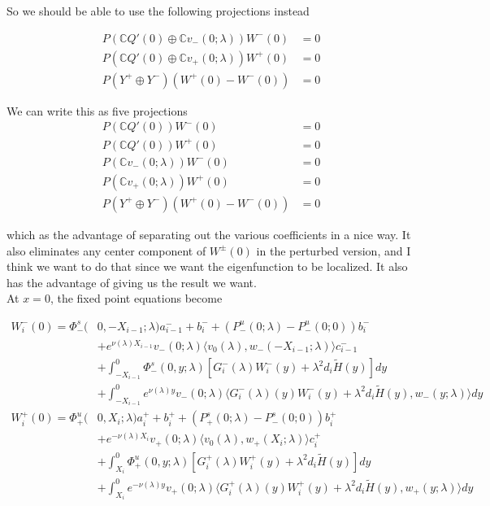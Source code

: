 \documentclass[12pt]{article}
\def\C{{\mathbb C}}
\begin{document}
\begin{enumerate}
So we should be able to use the following projections instead

\begin{align*}
P(\C Q'(0) \oplus \C v_-(0; \lambda) )W^-(0) &= 0 \\
P(\C Q'(0) \oplus \C v_+(0; \lambda) )W^+(0) &= 0 \\
P(Y^+ \oplus Y^-) (W^+(0) - W^-(0) ) &= 0
\end{align*}

We can write this as five projections
\begin{align*}
P(\C Q'(0) )W^-(0) &= 0 \\
P(\C Q'(0) )W^+(0) &= 0 \\
P(\C v_-(0; \lambda))W^-(0) &= 0 \\
P(\C v_+(0; \lambda))W^+(0) &= 0 \\
P(Y^+ \oplus Y^-) (W^+(0) - W^-(0) ) &= 0
\end{align*}

which as the advantage of separating out the various coefficients in a nice way. It also eliminates any center component of $W^\pm(0)$ in the perturbed version, and I think we want to do that since we want the eigenfunction to be localized. It also has the advantage of giving us the result we want.\\

At $x = 0$, the fixed point equations become

\begin{align*}
W_i^-(0) = \Phi^s_-(&0, -X_{i-1}; \lambda)a_{i-1}^- + b_i^- + (P^u_-(0; \lambda) - P^u_-(0; 0))b_i^- \\
&+ e^{\nu(\lambda)X_{i-1}} v_-(0; \lambda) \langle v_0(\lambda), w_-(-X_{i-1}; \lambda) \rangle c_{i-1}^- \\
&+ \int_{-X_{i-1}}^0 \Phi^s_-(0, y; \lambda) [ G_i^-(\lambda)W_i^-(y) + \lambda^2 d_i \tilde{H}(y) ] dy \\
&+ \int_{-X_{i-1}}^0
e^{\nu(\lambda)y} v_-(0; \lambda) \langle G_i^-(\lambda)(y)W_i^-(y) + \lambda^2 d_i \tilde{H}(y), w_-(y; \lambda) \rangle dy \\
W_i^+(0) = \Phi^u_+(&0, X_i; \lambda)a_i^+ + b_i^+ + (P^s_+(0; \lambda) - P^s_-(0; 0))b_i^+ \\
&+ e^{-\nu(\lambda) X_i} v_+(0; \lambda) \langle v_0(\lambda), w_+(X_i; \lambda) \rangle c_i^+ \\
&+ \int_{X_i}^0 \Phi^u_+(0, y; \lambda) [ G_i^+(\lambda)W_i^+(y) + \lambda^2 d_i \tilde{H}(y) ] dy \\
&+ \int_{X_i}^0 e^{-\nu(\lambda)y} v_+(0; \lambda) \langle G_i^+(\lambda)(y)W_i^+(y) + \lambda^2 d_i \tilde{H}(y), w_+(y; \lambda) \rangle dy
\end{align*}


\end{enumerate}
\end{document}
